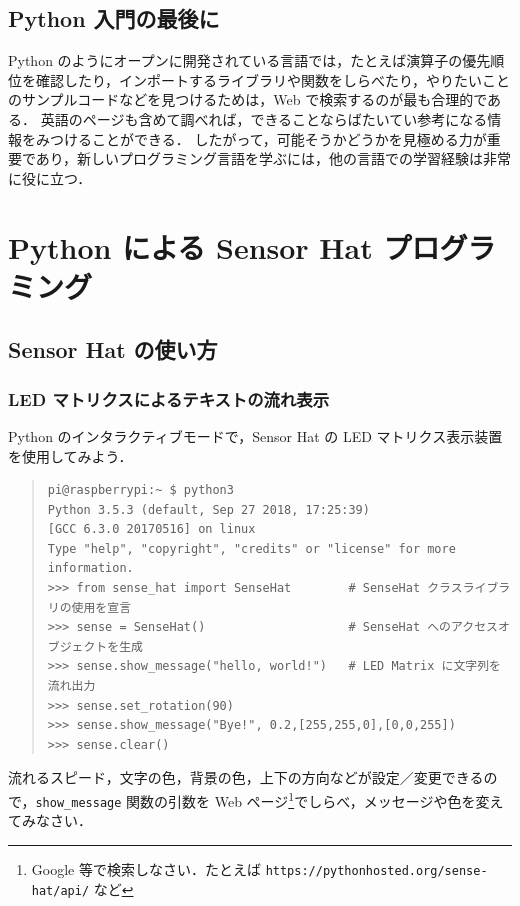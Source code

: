 \documentclass[11pt,a4,epsf]{report}
\begin{document}
\section{Python 入門の最後に}

Python のようにオープンに開発されている言語では，たとえば演算子の優先順位を確認したり，インポートするライブラリや関数をしらべたり，やりたいことのサンプルコードなどを見つけるためは，Web で検索するのが最も合理的である．
英語のページも含めて調べれば，できることならばたいてい参考になる情報をみつけることができる．
したがって，可能そうかどうかを見極める力が重要であり，新しいプログラミング言語を学ぶには，他の言語での学習経験は非常に役に立つ．


\chapter{Python による Sensor Hat プログラミング}

\section{Sensor Hat の使い方}

\subsection{LED マトリクスによるテキストの流れ表示}

Python のインタラクティブモードで，Sensor Hat の LED マトリクス表示装置を使用してみよう．
\begin{quote}
\small
\begin{verbatim}
pi@raspberrypi:~ $ python3
Python 3.5.3 (default, Sep 27 2018, 17:25:39) 
[GCC 6.3.0 20170516] on linux
Type "help", "copyright", "credits" or "license" for more information.
>>> from sense_hat import SenseHat        # SenseHat クラスライブラリの使用を宣言
>>> sense = SenseHat()                    # SenseHat へのアクセスオブジェクトを生成
>>> sense.show_message("hello, world!")   # LED Matrix に文字列を流れ出力
>>> sense.set_rotation(90)
>>> sense.show_message("Bye!", 0.2,[255,255,0],[0,0,255])
>>> sense.clear()
\end{verbatim}
\end{quote}

\begin{excercise}
流れるスピード，文字の色，背景の色，上下の方向などが設定／変更できるので，\verb+show_message+ 関数の引数を Web ページ\footnote{Google 等で検索しなさい．たとえば {\tt https://pythonhosted.org/sense-hat/api/} など}でしらべ，メッセージや色を変えてみなさい．
\end{excercise}
\end{document}

